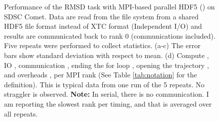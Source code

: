 \begin{figure}[ht!]
\begin{subfigure} {.5\textwidth}
  \label{fig:MPIranks-hdf5}
\end{subfigure}
%
\caption{Performance of the RMSD task with MPI-based parallel HDF5 () on SDSC Comet.
Data are read from the file system from a shared HDF5 file format instead of XTC format (Independent I/O) and results are communicated back to rank 0 (communications included). 
Five repeats were performed to collect statistics. (a-c) The error bars show standard deviation with respect to mean. (d) Compute \tcomp, IO \tIO, communication \tcomm, ending the for loop ,
  opening the trajectory , and overheads ,  per MPI rank (See Table \ref{tab:notation} for the definition).
  This is typical data from one run of the 5 repeats. No straggler is observed. \textbf{Note:} In serial, there is no communication. I am reporting the slowest rank per timing, and that is averaged over all repeats.}
\label{fig:MPIwithIO-hdf5}
\end{figure}
